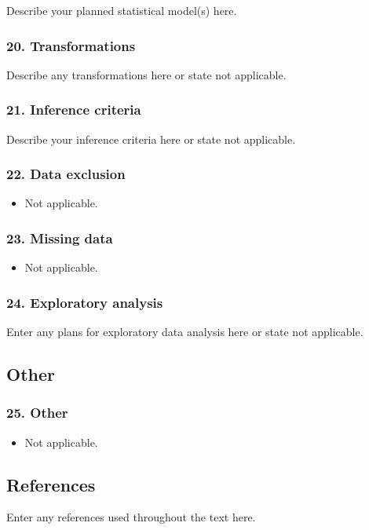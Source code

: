 \documentclass[
]{article}
\providecommand{\tightlist}{%
  \setlength{\itemsep}{0pt}\setlength{\parskip}{0pt}}
\begin{document}
Describe your planned statistical model(s) here.

\hypertarget{transformations}{%
\subsubsection{20. Transformations}\label{transformations}}

Describe any transformations here or state not applicable.

\hypertarget{inference-criteria}{%
\subsubsection{21. Inference criteria}\label{inference-criteria}}

Describe your inference criteria here or state not applicable.

\hypertarget{data-exclusion}{%
\subsubsection{22. Data exclusion}\label{data-exclusion}}

\begin{itemize}
\tightlist
\item
  Not applicable.
\end{itemize}

\hypertarget{missing-data}{%
\subsubsection{23. Missing data}\label{missing-data}}

\begin{itemize}
\tightlist
\item
  Not applicable.
\end{itemize}

\hypertarget{exploratory-analysis}{%
\subsubsection{24. Exploratory analysis}\label{exploratory-analysis}}

Enter any plans for exploratory data analysis here or state not
applicable.

\hypertarget{other}{%
\subsection{Other}\label{other}}

\hypertarget{other-1}{%
\subsubsection{25. Other}\label{other-1}}

\begin{itemize}
\tightlist
\item
  Not applicable.
\end{itemize}

\hypertarget{references}{%
\subsection{References}\label{references}}

Enter any references used throughout the text here.
\end{document}
